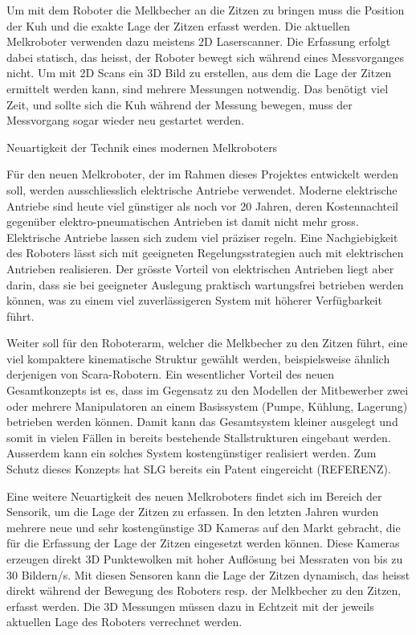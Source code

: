 Um mit dem Roboter die Melkbecher an die Zitzen zu bringen muss die Position der Kuh und die exakte Lage der Zitzen erfasst werden. Die aktuellen Melkroboter verwenden dazu meistens 2D Laserscanner. Die Erfassung erfolgt dabei statisch, das heisst, der Roboter bewegt sich während eines Messvorganges nicht. Um mit 2D Scans ein 3D Bild zu erstellen, aus dem die Lage der Zitzen ermittelt werden kann, sind mehrere Messungen notwendig. Das benötigt viel Zeit, und sollte sich die Kuh während der Messung bewegen, muss der Messvorgang sogar wieder neu gestartet werden.

Neuartigkeit der Technik eines modernen Melkroboters

Für den neuen Melkroboter, der im Rahmen dieses Projektes entwickelt werden soll, werden ausschliesslich elektrische Antriebe verwendet. Moderne elektrische Antriebe sind heute viel günstiger als noch vor 20 Jahren, deren Kostennachteil gegenüber elektro-pneumatischen Antrieben ist damit nicht mehr gross. Elektrische Antriebe lassen sich zudem viel präziser regeln. Eine Nachgiebigkeit des Roboters lässt sich mit geeigneten Regelungsstrategien auch mit elektrischen Antrieben realisieren. Der grösste Vorteil von elektrischen Antrieben liegt aber darin, dass sie bei geeigneter Auslegung praktisch wartungsfrei betrieben werden können, was zu einem viel zuverlässigeren System mit höherer Verfügbarkeit führt.
    
Weiter soll für den Roboterarm, welcher die Melkbecher zu den Zitzen führt, eine viel kompaktere kinematische Struktur gewählt werden, beispielsweise ähnlich derjenigen von Scara-Robotern. Ein wesentlicher Vorteil des neuen Gesamtkonzepts ist es, dass im Gegensatz zu den Modellen der Mitbewerber zwei oder mehrere Manipulatoren an einem Basissystem (Pumpe, Kühlung, Lagerung) betrieben werden können. Damit kann das Gesamtsystem kleiner ausgelegt und somit in vielen Fällen in bereits bestehende Stallstrukturen eingebaut werden. Ausserdem kann ein solches System kostengünstiger realisiert werden. Zum Schutz dieses Konzepts hat SLG bereits ein Patent eingereicht (REFERENZ).

Eine weitere Neuartigkeit des neuen Melkroboters findet sich im Bereich der Sensorik, um die Lage der Zitzen zu erfassen. In den letzten Jahren wurden mehrere neue und sehr kostengünstige 3D Kameras auf den Markt gebracht, die für die Erfassung der Lage der Zitzen eingesetzt werden können. Diese Kameras erzeugen direkt 3D Punktewolken mit hoher Auflösung bei Messraten von bis zu 30 Bildern/s. Mit diesen Sensoren kann die Lage der Zitzen dynamisch, das heisst direkt während der Bewegung des Roboters resp. der Melkbecher zu den Zitzen, erfasst werden. Die 3D Messungen müssen dazu in Echtzeit mit der jeweils aktuellen Lage des Roboters verrechnet werden. 

